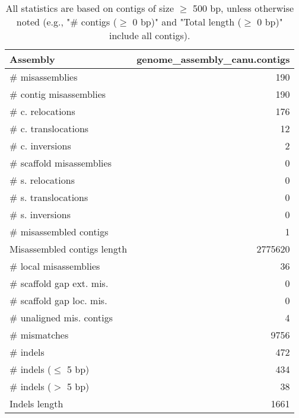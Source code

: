 \documentclass[12pt,a4paper]{article}
\begin{document}
\begin{table}[ht]
\begin{center}
\caption{All statistics are based on contigs of size $\geq$ 500 bp, unless otherwise noted (e.g., "\# contigs ($\geq$ 0 bp)" and "Total length ($\geq$ 0 bp)" include all contigs).}
\begin{tabular}{|l*{1}{|r}|}
\hline
Assembly & genome\_assembly\_canu.contigs \\ \hline
\# misassemblies & 190 \\ \hline
\hspace{2mm}\# contig misassemblies & 190 \\ \hline
\hspace{5mm}\# c. relocations & 176 \\ \hline
\hspace{5mm}\# c. translocations & 12 \\ \hline
\hspace{5mm}\# c. inversions & 2 \\ \hline
\hspace{2mm}\# scaffold misassemblies & 0 \\ \hline
\hspace{5mm}\# s. relocations & 0 \\ \hline
\hspace{5mm}\# s. translocations & 0 \\ \hline
\hspace{5mm}\# s. inversions & 0 \\ \hline
\# misassembled contigs & 1 \\ \hline
Misassembled contigs length & 2775620 \\ \hline
\# local misassemblies & 36 \\ \hline
\# scaffold gap ext. mis. & 0 \\ \hline
\# scaffold gap loc. mis. & 0 \\ \hline
\# unaligned mis. contigs & 4 \\ \hline
\# mismatches & 9756 \\ \hline
\# indels & 472 \\ \hline
\hspace{5mm}\# indels ($\leq$ 5 bp) & 434 \\ \hline
\hspace{5mm}\# indels ($>$ 5 bp) & 38 \\ \hline
Indels length & 1661 \\ \hline
\end{tabular}
\end{center}
\end{table}
\end{document}

